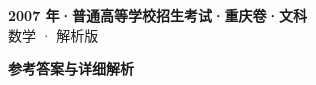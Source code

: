 \documentclass[zihao=-4, a4paper]{ctexart}
\begin{document}
\begin{center}
  {\Large\bfseries 2007 年·普通高等学校招生考试·重庆卷·文科}\\[4pt]
  {\large 数学 · 解析版}
\end{center}
\medskip
{}

\clearpage
{}
\begin{center}{\Large\bfseries 参考答案与详细解析}\end{center}
\medskip

\end{document}
